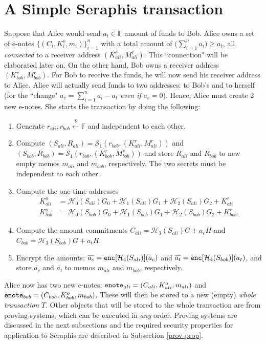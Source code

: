 \documentclass{article}
\theoremstyle{plain}
\theoremstyle{remark}
\begin{document}
\section{A Simple Seraphis transaction}\label{ser-tx}
Suppose that Alice would send $a_t\in\mathbb{F}$ amount of funds to Bob. Alice owns a set of e-notes $\{(C_i,K_i^o,m_i)\}_{i=1}^n$ with a total amount of $\big(\sum_{i=1}^{n}{a_i}\big)\ge a_t$, all \textit{connected} to a receiver address $(K_{ali}^r, M_{ali}^r)$. This ``connection" will be elaborated later on. On the other hand, Bob owns a receiver address  $(K_{bob}^r, M_{bob}^r)$. For Bob to receive the funds, he will now send his receiver address to Alice. Alice will actually send funds to two addresses: to Bob's and to herself (for the ``change" $a_{c} = \sum_{i=1}^{n}{a_i} - a_t$ \textit{even if} $a_{c}=0$). Hence, Alice must create 2 new e-notes. She starts the transaction by doing the following:
\begin{enumerate}
    \item Generate $r_{ali}, r_{bob}\xleftarrow{\$}\mathbb{F}$ and independent to each other.
    \item Compute $(S_{ali}, R_{ali}) = \mathcal{S}_1(r_{bob}, (K_{ali}^r, M_{ali}^r))$ and $(S_{bob}, R_{bob}) = \mathcal{S}_1(r_{bob}, (K_{bob}^r, M_{bob}^r))$ and store $R_{ali}$ and $R_{bob}$ to new empty memos $m_{ali}$ and $m_{bob}$, respectively. The two secrets must be independent to each other.
    \item Compute the one-time addresses
    \begin{align*}
        K_{ali}^o &= \mathcal{H}_0(S_{ali}) G_0 + \mathcal{H}_1(S_{ali}) G_1 + \mathcal{H}_2(S_{ali}) G_2 + K_{ali}^r\\
        K_{bob}^o &= \mathcal{H}_0(S_{bob}) G_0 + \mathcal{H}_1(S_{bob}) G_1 + \mathcal{H}_2(S_{bob}) G_2+ K_{bob}^r.
    \end{align*}    
    \item Compute the amount commitments $C_{ali} = \mathcal{H}_3(S_{ali}) G + a_c H$ and $C_{bob} = \mathcal{H}_3(S_{bob}) G + a_t H$. 
    \item Encrypt the amounts: $\overline{a_c} = {\tt enc}[\mathcal{H}_4(S_{ali})](a_c)$ and $\overline{a_t} = {\tt enc}[\mathcal{H}_4(S_{bob})](a_t)$, and store $\overline{a_c}$ and $\overline{a_t}$ to memos $m_{ali}$ and $m_{bob}$, respectively.
\end{enumerate}
Alice now has two new e-notes: ${\tt enote}_{ali} = (C_{ali}, K_{ali}^o, m_{ali})$ and ${\tt enote}_{bob} = (C_{bob}, K_{bob}^o, m_{bob})$. These will then be stored to a new (empty) \textit{whole transaction} $T$. Other objects that will be stored to the whole transaction are from proving systems, which can be executed in \textit{any} order. Proving systems are discussed in the next subsections and the required security properties for application to Seraphis are described in Subsection \ref{prov-prop}.
\end{document}

